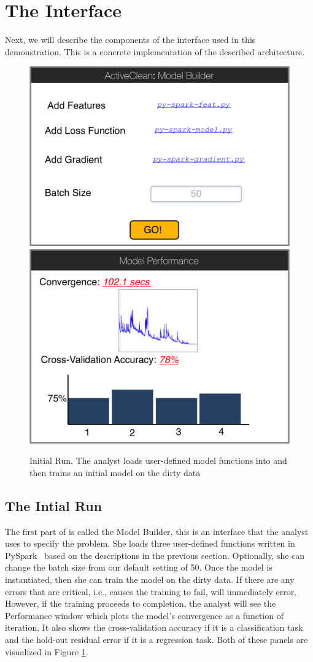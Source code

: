 \section{The Interface}
Next, we will describe the components of the \sys interface used in this demonstration. This is a concrete implementation of the described architecture.


\begin{figure}[t]
\centering
 \includegraphics[width=0.48\columnwidth]{figs/interface1.png}
 \includegraphics[width=0.48\columnwidth]{figs/interface2.png}
 \caption{Initial Run. The analyst loads user-defined model functions into \sys and then trains an initial model on the dirty data \label{irun}}
\end{figure}

\subsection{The Intial Run}
The first part of \sys is called the \textsf{Model Builder}, this is an interface that the analyst uses to specify the problem.
She loads three user-defined functions written in PySpark~\cite{pyspark} based on the descriptions in the previous section.
Optionally, she can change the batch size from our default setting of 50.
Once the model is instantiated, then she can train the model on the dirty data.
If there are any errors that are critical, i.e., causes the training to fail, \sys will immediately error.
However, if the training proceeds to completion, the analyst will see the \textsf{Performance} window which plots the model's convergence as a function of iteration.
It also shows the cross-validation accuracy if it is a classification task and the hold-out residual error if it is a regression task.
Both of these panels are visualized in Figure \ref{irun}.

